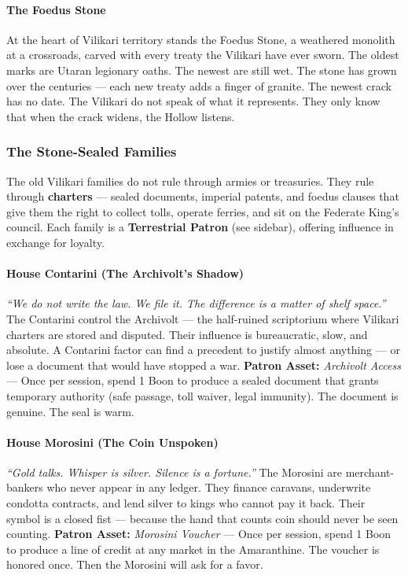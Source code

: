 \paragraph{The Foedus Stone}
At the heart of Vilikari territory stands the Foedus Stone, a weathered monolith at a crossroads, carved with every treaty the Vilikari have ever sworn. The oldest marks are Utaran legionary oaths. The newest are still wet. The stone has grown over the centuries --- each new treaty adds a finger of granite. The newest crack has no date. The Vilikari do not speak of what it represents. They only know that when the crack widens, the Hollow listens.

\subsubsection*{The Stone-Sealed Families}

The old Vilikari families do not rule through armies or treasuries. They rule through \textbf{charters} --- sealed documents, imperial patents, and foedus clauses that give them the right to collect tolls, operate ferries, and sit on the Federate King's council. Each family is a \textbf{Terrestrial Patron} (see sidebar), offering influence in exchange for loyalty.

\paragraph{House Contarini (The Archivolt's Shadow)}
\textit{``We do not write the law. We file it. The difference is a matter of shelf space.''}
The Contarini control the Archivolt --- the half-ruined scriptorium where Vilikari charters are stored and disputed. Their influence is bureaucratic, slow, and absolute. A Contarini factor can find a precedent to justify almost anything --- or lose a document that would have stopped a war.
\textbf{Patron Asset:} \textit{Archivolt Access} --- Once per session, spend 1 Boon to produce a sealed document that grants temporary authority (safe passage, toll waiver, legal immunity). The document is genuine. The seal is warm.

\paragraph{House Morosini (The Coin Unspoken)}
\textit{``Gold talks. Whisper is silver. Silence is a fortune.''}
The Morosini are merchant-bankers who never appear in any ledger. They finance caravans, underwrite condotta contracts, and lend silver to kings who cannot pay it back. Their symbol is a closed fist --- because the hand that counts coin should never be seen counting.
\textbf{Patron Asset:} \textit{Morosini Voucher} --- Once per session, spend 1 Boon to produce a line of credit at any market in the Amaranthine. The voucher is honored once. Then the Morosini will ask for a favor.

